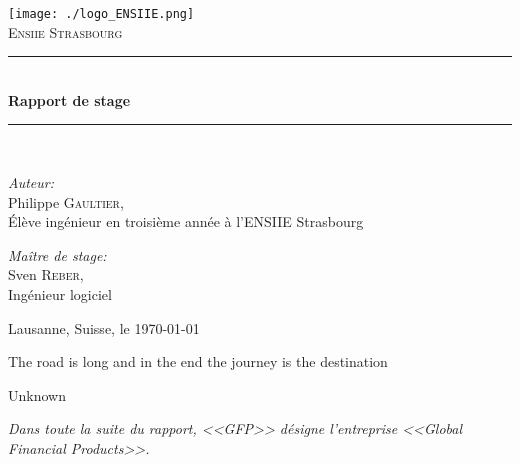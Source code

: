 \documentclass[a4paper,french,12pt]{article}
\newcommand{\HRule}{\rule{\linewidth}{0.5mm}}
\begin{document}
\begin{titlepage}
\begin{center}

\texttt{[image: ./logo\_ENSIIE.png]}~\\[1cm]
\textsc{\huge Ensiie Strasbourg}\\[1.5cm]

\HRule \\[0.4cm]
{
	\huge \bfseries Rapport de stage
\\[0.4cm] }
\HRule \\[1.5cm]

\begin{minipage}{0.4\textwidth}
\begin{flushleft} \huge
\emph{Auteur:}\\
Philippe \textsc{Gaultier},\\[0.5cm]
\Large \'Elève ingénieur en troisième année à l'ENSIIE Strasbourg
\end{flushleft}
\end{minipage}
\begin{minipage}{0.4\textwidth}
\begin{flushright} \huge
\emph{Maître de stage:} \\
Sven \textsc{Reber},\\[0.5cm]
\Large Ingénieur logiciel
\end{flushright}
\end{minipage}

\vfill

{\large Lausanne, Suisse, le \today}



\end{center}
\end{titlepage}

\newpage
{
  \centering
  {
    \vspace{3cm}

    \vspace{3cm}
    \epigraph{The road is long and in the end the journey is the destination}{Unknown}
  }
}
\newpage
\textit{\normalsize Dans toute la suite du rapport, <<GFP>> désigne l'entreprise <<Global Financial Products>>.}
\setlength{\columnseprule}{0.5pt}

\tableofcontents
\listoffigures
\end{document}

